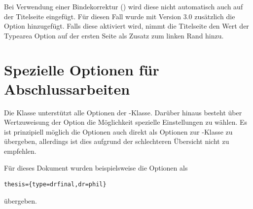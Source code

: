 Bei Verwendung einer Bindekorrektur () wird diese nicht automatisch auch auf der Titelseite eingefügt. Für diesen Fall wurde mit Version 3.0 zusätzlich die Option  hinzugefügt. Falls diese aktiviert wird, nimmt die Titelseite den Wert der Typearea Option  auf der ersten Seite als Zusatz zum linken Rand hinzu.



\section{Spezielle Optionen für Abschlussarbeiten}
Die Klasse unterstützt alle Optionen der -Klasse. Darüber hinaus besteht über Wertzuweisung der Option  die Möglichkeit spezielle Einstellungen zu wählen.
Es ist prinzipiell möglich die Optionen auch direkt als Optionen zur -Klasse zu übergeben, allerdings ist dies aufgrund der schlechteren Übersicht nicht zu empfehlen.

Für dieses Dokument wurden beispielsweise die Optionen als
\begin{verbatim}
thesis={type=drfinal,dr=phil}
\end{verbatim}
übergeben.

